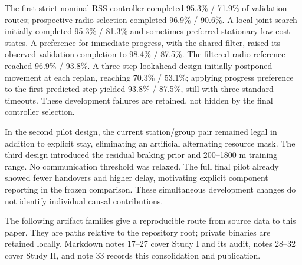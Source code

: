 The first strict nominal RSS controller completed 95.3\% / 71.9\% of validation
routes; prospective radio selection completed 96.9\% / 90.6\%. A local joint
search initially completed 95.3\% / 81.3\% and sometimes preferred stationary
low cost states. A preference for immediate progress, with the shared filter,
raised its observed validation completion to 98.4\% / 87.5\%. The filtered
radio reference reached 96.9\% / 93.8\%. A three step lookahead design initially
postponed movement at each replan, reaching 70.3\% / 53.1\%; applying progress
preference to the first predicted step yielded 93.8\% / 87.5\%, still with three
standard timeouts. These development failures are retained, not hidden by the
final controller selection.

In the second pilot design, the current station/group pair remained legal in
addition to explicit stay, eliminating an artificial alternating resource mask.
The third design introduced the residual braking prior and 200--1800 m training
range. No communication threshold was relaxed. The full final pilot already
showed fewer handovers and higher delay, motivating explicit component reporting
in the frozen comparison. These simultaneous development changes do not identify
individual causal contributions.

The following artifact families give a reproducible route from source data to
this paper. They are paths relative to the repository root; private binaries
are retained locally. Markdown notes 17--27 cover Study I and its audit, notes
28--32 cover Study II, and note 33 records this consolidation and publication.

